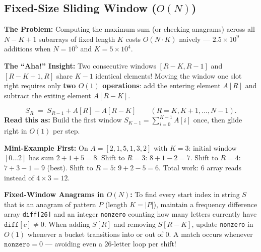 \documentclass[11pt,a4paper]{article}
\theoremstyle{definition}
\newcommand{\painbeat}{\textbf{\color{accentamber}The Problem:} }
\newcommand{\ahabeat}{\textbf{\color{accentteal}The ``Aha!'' Insight:} }
\newcommand{\examplebeat}{\textbf{\color{primaryblue}Mini-Example First:} }
\begin{document}
\subsection{Fixed-Size Sliding Window ($O(N)$)}

\painbeat Computing the maximum sum (or checking anagrams) across all $N - K + 1$ subarrays of fixed length $K$ costs $O(N \cdot K)$ naively --- $2.5 \times 10^9$ additions when $N = 10^5$ and $K = 5 \times 10^4$.

\ahabeat Two consecutive windows $[R - K, R - 1]$ and $[R - K + 1, R]$ share $K - 1$ identical elements! Moving the window one slot right requires only \textbf{two $O(1)$ operations}: add the entering element $A[R]$ and subtract the exiting element $A[R - K]$.

\begin{formulabox}
$$S_R \;=\; S_{R-1} + A[R] - A[R - K] \qquad (R = K, K+1, \dots, N-1).$$
\textbf{Read this as:} Build the first window $S_{K-1} = \sum_{i=0}^{K-1} A[i]$ once, then glide right in $O(1)$ per step.
\end{formulabox}

\examplebeat On $A = [2, 1, 5, 1, 3, 2]$ with $K = 3$: initial window $[0 \dots 2]$ has sum $2+1+5 = 8$. Shift to $R=3$: $8 + 1 - 2 = 7$. Shift to $R=4$: $7 + 3 - 1 = 9$ (best). Shift to $R=5$: $9 + 2 - 5 = 6$. Total work: $6$ array reads instead of $4 \times 3 = 12$.

\textbf{Fixed-Window Anagrams in $O(N)$:} To find every start index in string $S$ that is an anagram of pattern $P$ (length $K = |P|$), maintain a frequency difference array \texttt{diff[26]} and an integer \texttt{nonzero} counting how many letters currently have $\texttt{diff}[c] \ne 0$. When adding $S[R]$ and removing $S[R - K]$, update \texttt{nonzero} in $O(1)$ whenever a bucket transitions into or out of $0$. A match occurs whenever $\texttt{nonzero} = 0$ --- avoiding even a $26$-letter loop per shift!
\end{document}
